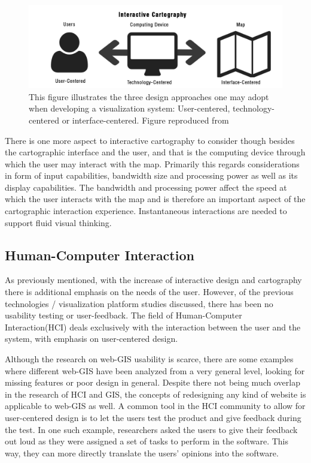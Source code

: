\documentclass[a4paper,12pt,titlepage]{article}
\begin{document}
\begin{figure}[H]
    \centering
        \includegraphics[width=12cm]{interactiveCartography}
    \caption{This figure illustrates the three design approaches one may adopt when developing a visualization system: User-centered, technology-centered or interface-centered. Figure reproduced from \citep[p. 64]{rothFramework}}  
    \label{fig:CartoInt}
\end{figure}

There is one more aspect to interactive cartography to consider though besides the cartographic interface and the user, and that is the computing device through which the user may interact with the map. Primarily this regards considerations in form of input capabilities, bandwidth size and processing power as well as its display capabilities. The bandwidth and processing power affect the speed at which the user interacts with the map and is therefore an important aspect of the cartographic interaction experience. Instantaneous interactions are needed to support fluid visual thinking. \citep{roth2013interactive}

\subsection{Human-Computer Interaction}

As previously mentioned, with the increase of interactive design and cartography there is additional emphasis on the needs of the user. However, of the previous technologies / visualization platform studies discussed, there has been no usability testing or user-feedback. The field of Human-Computer Interaction(HCI) deals exclusively with the interaction between the user and the system, with emphasis on user-centered design. \citep{HCI}

Although the research on web-GIS usability is scarce, there are some examples where different web-GIS have been analyzed from a very general level, looking for missing features or poor design in general. \citep{eggintoncommon} \citep{blekinge} Despite there not being much overlap in the research of HCI and GIS, the concepts of redesigning any kind of website is applicable to web-GIS as well. A common tool in the HCI community to allow for user-centered design is to let the users test the product and give feedback during the test. In one such example, researchers asked the users to give their feedback out loud as they were assigned a set of tasks to perform in the software. This way, they can more directly translate the users' opinions into the software. \citep{modeling}
\end{document}
